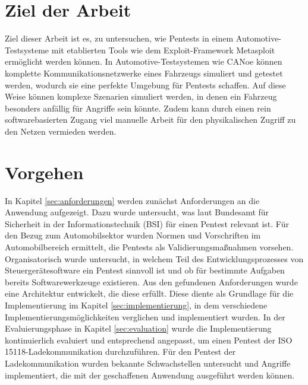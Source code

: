 \section{Ziel der Arbeit}\label{sec:ziel}

Ziel dieser Arbeit ist es, zu untersuchen, wie Pentests in einem Automotive-Testsysteme mit etablierten Tools wie dem Exploit-Framework Metasploit ermöglicht werden können. In Automotive-Testsystemen wie CANoe können komplette Kommunikationsnetzwerke eines Fahrzeugs simuliert und getestet werden, wodurch sie eine perfekte Umgebung für Pentests schaffen. Auf diese Weise können komplexe Szenarien simuliert werden, in denen ein Fahrzeug besonders anfällig für Angriffe sein könnte. Zudem kann durch einen rein softwarebasierten Zugang viel manuelle Arbeit für den physikalischen Zugriff zu den Netzen vermieden werden. 

\section{Vorgehen}\label{sec:vorgehen}

In Kapitel \ref{sec:anforderungen} werden zunächst Anforderungen an die Anwendung aufgezeigt. Dazu wurde untersucht, was laut Bundesamt für Sicherheit in der Informationstechnik (BSI) für einen Pentest relevant ist. Für den Bezug zum Automobilsektor wurden Normen und Vorschriften im Automobilbereich ermittelt, die Pentests als Validierungsmaßnahmen vorsehen. Organisatorisch wurde untersucht, in welchem Teil des Entwicklungsprozesses von Steuergerätesoftware ein Pentest sinnvoll ist und ob für bestimmte Aufgaben bereits Softwarewerkzeuge existieren. Aus den gefundenen Anforderungen wurde eine Architektur entwickelt, die diese erfüllt. Diese diente als Grundlage für die Implementierung im Kapitel \ref{sec:implementierung}, in dem verschiedene Implementierungsmöglichkeiten verglichen und implementiert wurden. In der Evaluierungsphase in Kapitel \ref{sec:evaluation} wurde die Implementierung kontinuierlich evaluiert und entsprechend angepasst, um einen Pentest der ISO 15118-Ladekommunikation durchzuführen. Für den Pentest der Ladekommunikation wurden bekannte Schwachstellen untersucht und Angriffe implementiert, die mit der geschaffenen Anwendung ausgeführt werden können. 